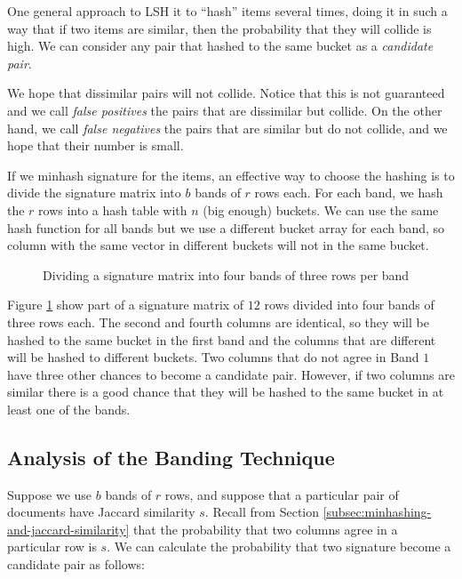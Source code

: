 One general approach to LSH it to ``hash'' items several times, doing it in such a way that if two items are similar, then the probability that they will collide is high. We can consider any pair that hashed to the same bucket as a \textit{candidate pair}.

We hope that dissimilar pairs will not collide. Notice that this is not guaranteed and we call \textit{false positives} the pairs that are dissimilar but collide. On the other hand, we call \textit{false negatives} the pairs that are similar but do not collide, and we hope that their number is small.

If we minhash signature for the items, an effective way to choose the hashing is to divide the signature matrix into $b$ bands of $r$ rows each. For each band, we hash the $r$ rows into a hash table with $n$ (big enough) buckets. We can use the same hash function for all bands but we use a different bucket array for each band, so column with the same vector in different buckets will not in the same bucket.


\begin{figure}[H]
\centering
\scalebox{1}{
    
}
\caption{Dividing a signature matrix into four bands of three rows per band}
\label{fig:4-signature-matrix-4-bands}
\end{figure}

Figure \ref{fig:4-signature-matrix-4-bands} show part of a signature matrix of $12$ rows divided into four bands of three rows each. The second and fourth columns are identical, so they will be hashed to the same bucket in the first band and the columns that are different will be hashed to different buckets. Two columns that do not agree in Band $1$ have three other chances to become a candidate pair. However, if two columns are similar there is a good chance that they will be hashed to the same bucket in at least one of the bands.

\subsection{Analysis of the Banding Technique}\label{sec:analysis-banding-technique}

Suppose we use $b$ bands of $r$ rows, and suppose that a particular pair of documents have Jaccard similarity $s$. Recall from Section \ref{subsec:minhashing-and-jaccard-similarity} that the probability that two columns agree in a particular row is $s$. We can calculate the probability that two signature become a candidate pair as follows:

